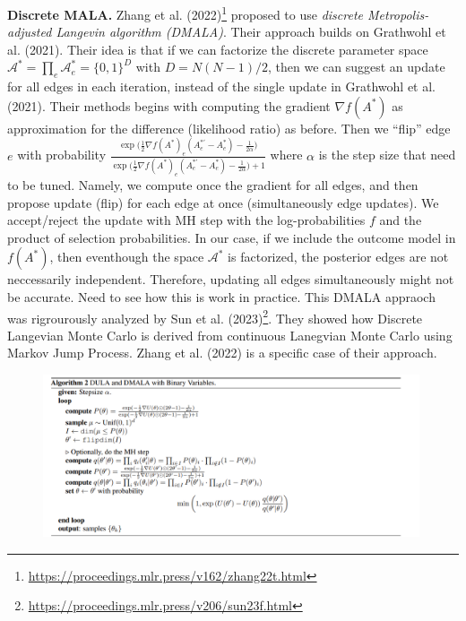 \documentclass[12pt]{article}
\begin{document}
\begin{enumerate}
            \textbf{Discrete MALA.} Zhang et al. (2022)\footnote{\url{https://proceedings.mlr.press/v162/zhang22t.html}}
            proposed to use \textit{discrete Metropolis-adjusted Langevin algorithm (DMALA)}.
            Their approach builds on Grathwohl et al. (2021). 
            Their idea is that if we can factorize the discrete parameter space 
            $\mathcal{A}^\ast = \prod_e \mathcal{A}^\ast_e = \{0,1\}^D$ with $D=N(N-1)/2$, then we can
            suggest an update for all edges in each iteration, instead of the single
            update in Grathwohl et al. (2021).
            Their methods begins with computing the gradient $\nabla f(A^\ast)$ 
            as approximation for the difference (likelihood ratio) as before. 
            Then we ``flip'' edge $e$ with probability 
            $\frac{\exp\big(\frac{1}{2}\nabla f(A^\ast)_e (A^{\ast'}_e - A^\ast_e) - \frac{1}{2\alpha}\big)}{
                \exp\big(\frac{1}{2}\nabla f(A^\ast)_e (A^{\ast'}_e - A^\ast_e) - \frac{1}{2\alpha}\big) + 1
            } $
            where $\alpha$ is the step size that need to be tuned. 
            Namely, we compute once the gradient for all edges, and then propose 
            update (flip) for each edge at once (simultaneously edge updates). 
            We accept/reject the update with MH step with the log-probabilities $f$ 
            and the product of selection probabilities.
            In our case, if we include the outcome model in $f(A^\ast)$,
            then eventhough the space $\mathcal{A}^\ast$ is factorized, the posterior
            edges are not neccessarily independent.
            Therefore, updating all edges simultaneously might not be accurate.
            Need to see how this is work in practice.
            This DMALA appraoch was rigrourously analyzed by Sun et al. (2023)\footnote{\url{https://proceedings.mlr.press/v206/sun23f.html}}.
            They showed how Discrete Langevian Monte Carlo is derived
            from continuous Lanegvian Monte Carlo using Markov Jump Process.
            Zhang et al. (2022) is a specific case of their approach. 
            \begin{figure}[!ht]
                \centering
                \includegraphics[width=0.99\textwidth]{dmala.png}
            \end{figure}

        \end{enumerate}
\end{document}
